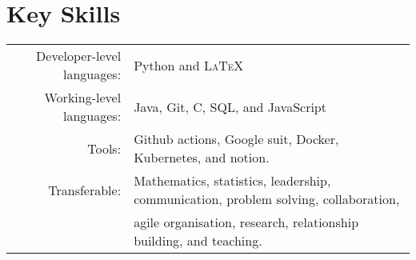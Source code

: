\documentclass[a4paper,10pt]{article}
\begin{document}
\vspace{-0.05 in}

\section{Key Skills}
\begin{tabular}{rl}
	Developer-level languages: &  Python and \textsc{LaTeX}\\
	Working-level languages: & Java, Git, C, SQL, and JavaScript\\
	Tools: & Github actions, Google suit, Docker, Kubernetes, and notion.\\
	Transferable: & Mathematics, statistics, leadership, communication, problem solving, collaboration,\\
	& agile organisation, research, relationship building, and teaching. 	
\end{tabular}
\vspace{-0.05 in}
\end{document}
